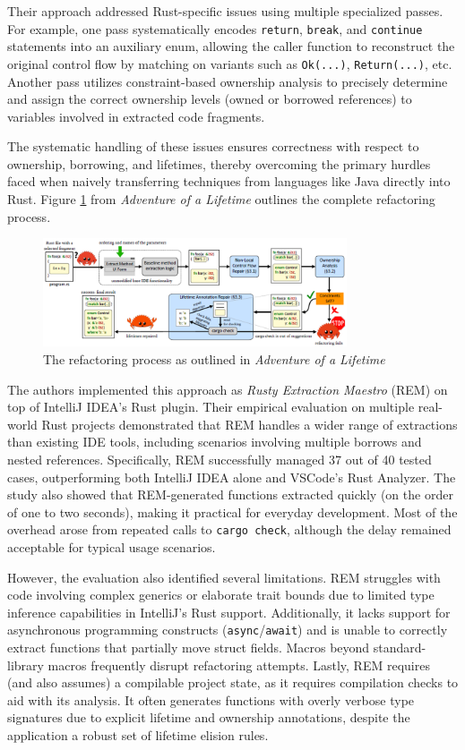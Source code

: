 Their approach addressed Rust-specific issues using multiple specialized passes.
For example, one pass systematically encodes \texttt{return}, \texttt{break},
and \texttt{continue} statements into an auxiliary enum, allowing the caller
function to reconstruct the original control flow by matching on variants such
as \texttt{Ok(...)}, \texttt{Return(...)}, etc. Another pass utilizes
constraint-based ownership analysis to precisely determine and assign the
correct ownership levels (owned or borrowed references) to variables involved in
extracted code fragments.

The systematic handling of these issues ensures correctness with respect to
ownership, borrowing, and lifetimes, thereby overcoming the primary hurdles
faced when naively transferring techniques from languages like Java directly
into Rust. Figure \ref{fig:aol_process} from \textit{Adventure of a Lifetime} outlines the complete
refactoring process.

\begin{figure}[H]
    \centering
    \includegraphics[width=0.8\textwidth]{Figures/AoL_algorithm.png}
    \caption{The refactoring process as outlined in \textit{Adventure of a Lifetime}}
    \label{fig:aol_process}
\end{figure}

The authors implemented this approach as \textit{Rusty Extraction Maestro} (REM)
on top of IntelliJ IDEA's Rust plugin. Their empirical evaluation on multiple
real-world Rust projects demonstrated that REM handles a wider range of
extractions than existing IDE tools, including scenarios involving multiple
borrows and nested references. Specifically, REM successfully managed 37 out of
40 tested cases, outperforming both IntelliJ IDEA alone and VSCode's Rust
Analyzer. The study also showed that REM-generated functions extracted quickly
(on the order of one to two seconds), making it practical for everyday
development. Most of the overhead arose from repeated calls to \texttt{cargo
check}, although the delay remained acceptable for typical usage scenarios.

However, the evaluation also identified several limitations. REM struggles with
code involving complex generics or elaborate trait bounds due to limited type
inference capabilities in IntelliJ's Rust support. Additionally, it lacks
support for asynchronous programming constructs (\texttt{async}/\texttt{await})
and is unable to correctly extract functions that partially move struct fields.
Macros beyond standard-library macros frequently disrupt refactoring attempts.
Lastly, REM requires (and also assumes) a compilable project state, as it
requires compilation checks to aid with its analysis. It often generates
functions with overly verbose type signatures due to explicit lifetime and
ownership annotations, despite the application a robust set of lifetime elision
rules.

